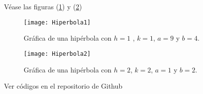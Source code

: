 \documentclass[12pt,a4paper]{article}
\begin{document}
Véase las figuras (\ref{fig:hiperbola-1}) y (\ref{fig:hiperbola-2})

\begin{figure}
\centering
\texttt{[image: Hiperbola1]}
\caption{Gráfica de una hipérbola con $h = 1$ , $k = 1$, $a = 9$ y $b = 4$.}
\label{fig:hiperbola-1}
\end{figure}

\begin{figure}
\centering
\texttt{[image: Hiperbola2]}
\caption{Gráfica de una hipérbola con $h = 2$, $k = 2$, $a = 1$ y $b = 2$.}
\label{fig:hiperbola-2}
\end{figure}



\newpage
Ver códigos en el repositorio de Github \citep{repositorio}



\end{document}
